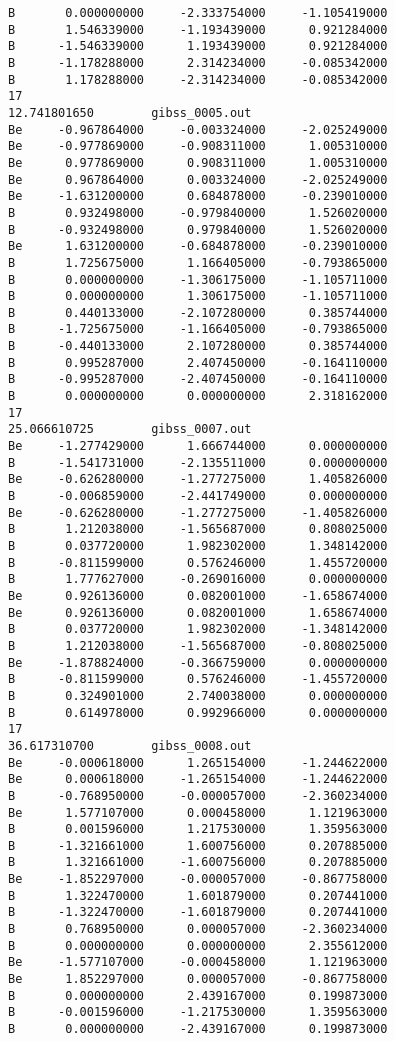 \documentclass[prb,aps,preprint,showkeys,showpacs]{revtex4}
\begin{document}
\begin{verbatim}
B       0.000000000     -2.333754000     -1.105419000
B       1.546339000     -1.193439000      0.921284000
B      -1.546339000      1.193439000      0.921284000
B      -1.178288000      2.314234000     -0.085342000
B       1.178288000     -2.314234000     -0.085342000
17    
12.741801650        gibss_0005.out
Be     -0.967864000     -0.003324000     -2.025249000
Be     -0.977869000     -0.908311000      1.005310000
Be      0.977869000      0.908311000      1.005310000
Be      0.967864000      0.003324000     -2.025249000
Be     -1.631200000      0.684878000     -0.239010000
B       0.932498000     -0.979840000      1.526020000
B      -0.932498000      0.979840000      1.526020000
Be      1.631200000     -0.684878000     -0.239010000
B       1.725675000      1.166405000     -0.793865000
B       0.000000000     -1.306175000     -1.105711000
B       0.000000000      1.306175000     -1.105711000
B       0.440133000     -2.107280000      0.385744000
B      -1.725675000     -1.166405000     -0.793865000
B      -0.440133000      2.107280000      0.385744000
B       0.995287000      2.407450000     -0.164110000
B      -0.995287000     -2.407450000     -0.164110000
B       0.000000000      0.000000000      2.318162000
17    
25.066610725        gibss_0007.out
Be     -1.277429000      1.666744000      0.000000000
B      -1.541731000     -2.135511000      0.000000000
Be     -0.626280000     -1.277275000      1.405826000
B      -0.006859000     -2.441749000      0.000000000
Be     -0.626280000     -1.277275000     -1.405826000
B       1.212038000     -1.565687000      0.808025000
B       0.037720000      1.982302000      1.348142000
B      -0.811599000      0.576246000      1.455720000
B       1.777627000     -0.269016000      0.000000000
Be      0.926136000      0.082001000     -1.658674000
Be      0.926136000      0.082001000      1.658674000
B       0.037720000      1.982302000     -1.348142000
B       1.212038000     -1.565687000     -0.808025000
Be     -1.878824000     -0.366759000      0.000000000
B      -0.811599000      0.576246000     -1.455720000
B       0.324901000      2.740038000      0.000000000
B       0.614978000      0.992966000      0.000000000
17    
36.617310700        gibss_0008.out
Be     -0.000618000      1.265154000     -1.244622000
Be      0.000618000     -1.265154000     -1.244622000
B      -0.768950000     -0.000057000     -2.360234000
Be      1.577107000      0.000458000      1.121963000
B       0.001596000      1.217530000      1.359563000
B      -1.321661000      1.600756000      0.207885000
B       1.321661000     -1.600756000      0.207885000
Be     -1.852297000     -0.000057000     -0.867758000
B       1.322470000      1.601879000      0.207441000
B      -1.322470000     -1.601879000      0.207441000
B       0.768950000      0.000057000     -2.360234000
B       0.000000000      0.000000000      2.355612000
Be     -1.577107000     -0.000458000      1.121963000
Be      1.852297000      0.000057000     -0.867758000
B       0.000000000      2.439167000      0.199873000
B      -0.001596000     -1.217530000      1.359563000
B       0.000000000     -2.439167000      0.199873000 
\end{verbatim}
\end{document}
